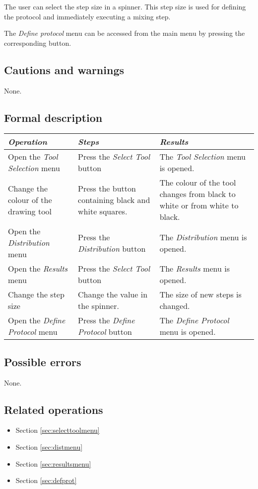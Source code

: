   The user can select the step size in a spinner. This step size is used for defining the protocol and immediately executing a mixing step.
  
  The \emph{Define protocol} menu can be accessed from the main menu by pressing the corresponding button.
  
  \subsection*{Cautions and warnings}
  None.

  \subsection*{Formal description}
  \begin{tabularx}{\textwidth}{XXX}
    \toprule
    \emph{Operation} & \emph{Steps} & \emph{Results} \\
    \midrule
    Open the \emph{Tool Selection} menu & Press the \emph{Select Tool} button & The \emph{Tool Selection} menu is opened. \\
    \midrule
    Change the colour of the drawing tool & Press the button containing black and white squares. & The colour of the tool changes from black to white or from white to black. \\
    \midrule
    Open the \emph{Distribution} menu & Press the \emph{Distribution} button & The \emph{Distribution} menu is opened. \\
    \midrule
    Open the \emph{Results} menu & Press the \emph{Select Tool} button & The \emph{Results} menu is opened. \\
    \midrule
    Change the step size & Change the value in the spinner. & The size of new steps is changed. \\
    \midrule
    Open the \emph{Define Protocol} menu & Press the \emph{Define Protocol} button & The \emph{Define Protocol} menu is opened. \\
    \bottomrule
  \end{tabularx}

  \subsection*{Possible errors}
  None.

  \subsection*{Related operations}
  \begin{itemize}
    \item Section \ref{sec:selecttoolmenu}
    \item Section \ref{sec:distmenu}
    \item Section \ref{sec:resultsmenu}
    \item Section \ref{sec:defprot}
  \end{itemize}

